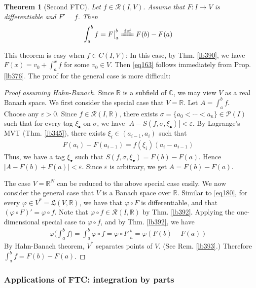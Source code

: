 \documentclass[12pt,b5paper,notitlepage]{article}
\theoremstyle{definition}
\theoremstyle{plain}
\newtheorem{thm}[df]{Theorem}
\newcommand{\fk}{\mathfrak}
\newcommand{\mc}{\mathcal}
\newcommand{\scr}{\mathscr}
\newcommand{\blt}{\bullet}
\newcommand{\Cbb}{\mathbb C}
\newcommand{\Rbb}{\mathbb R}
\newcommand{\eps}{\varepsilon}
\numberwithin{equation}{section}
\begin{document}
\begin{thm}[Second FTC]\label{lb391}
Let $f\in\scr R(I,V)$. Assume that $F:I\rightarrow V$ is differentiable and $F'=f$. Then
\begin{align}
\int_a^bf=F\big|^b_a\xlongequal{\mathrm{def}} F(b)-F(a)  \label{eq163}
\end{align}
\end{thm}

This theorem is easy when $f\in C(I,V)$: In this case,   by Thm. \ref{lb390}, we have $F(x)=v_0+\int_a^x f$ for some $v_0\in V$. Then \eqref{eq163} follows immediately from Prop. \ref{lb376}. The proof for the general case is more difficult:

\begin{proof}[Proof assuming Hahn-Banach]
Since $\Rbb$ is a subfield of $\Cbb$, we may view $V$ as a real Banach space. We first consider the special case that $V=\Rbb$. Let $A=\int_a^bf$. Choose any $\eps>0$. Since $f\in\scr R(I,\Rbb)$, there exists $\sigma=\{a_0<\cdots<a_n\}\in\mc P(I)$ such that for every tag $\xi_\blt$ on $\sigma$, we have $|A-S(f,\sigma,\xi_\blt)|<\eps$. By Lagrange's MVT (Thm. \ref{lb345}), there exists $\xi_i\in (a_{i-1},a_i)$ such that
\begin{align*}
F(a_i)-F(a_{i-1})=f(\xi_i)(a_i-a_{i-1})
\end{align*}
Thus, we have a tag $\xi_\blt$ such that $S(f,\sigma,\xi_\blt)=F(b)-F(a)$. Hence $|A-F(b)+F(a)|<\eps$. Since $\eps$ is arbitrary, we get $A=F(b)-F(a)$.

The case $V=\Rbb^N$ can be reduced to the above special case easily. We now consider the general case that $V$ is a Banach space over $\Rbb$. Similar to \eqref{eq180}, for every $\varphi\in V^*=\fk L(V,\Rbb)$,  we have that $\varphi\circ F$ is differentiable, and that $(\varphi\circ F)'=\varphi\circ f$. Note that $\varphi\circ f\in\scr R(I,\Rbb)$ by Thm. \ref{lb392}. Applying the one-dimensional special case to $\varphi\circ f$, and by Thm. \ref{lb392}, we have
\begin{align*}
\varphi\Big(\int_a^b f\Big)=\int_a^b \varphi\circ f=\varphi\circ F\big|_a^b=\varphi(F(b)-F(a))
\end{align*}
By Hahn-Banach theorem, $V^*$ separates points of $V$. (See Rem. \ref{lb393}.) Therefore $\int_a^b f=F(b)-F(a)$.
\end{proof}




\subsubsection{Applications of FTC: integration by parts}
\end{document}
